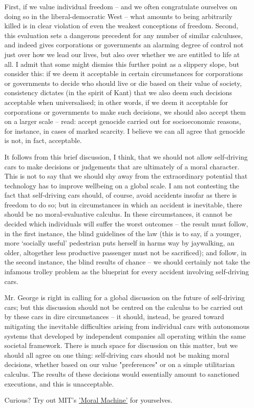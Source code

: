    First, if we value individual freedom -- and we often congratulate
   ourselves on doing so in the liberal-democratic West -- what amounts to
   being arbitrarily killed is in clear violation of even the weakest
   conceptions of freedom. Second, this evaluation sets a dangerous
   precedent for any number of similar calculuses, and indeed gives
   corporations or governments an alarming degree of control not just over
   how we lead our lives, but also over whether we are entitled to life at
   all. I admit that some might dismiss this further point as a slippery
   slope, but consider this: if we deem it acceptable in certain
   circumstances for corporations or governments to decide who should live
   or die based on their value of society, consistency dictates (in the
   spirit of Kant) that we also deem such decisions acceptable when
   universalised; in other words, if we deem it acceptable for
   corporations or governments to make such decisions, we should also
   accept them on a larger scale -- read: accept genocide carried out for
   socioeconomic reasons, for instance, in cases of marked scarcity. I
   believe we can all agree that genocide is not, in fact, acceptable.

   It follows from this brief discussion, I think, that we should not
   allow self-driving cars to make decisions or judgements that are
   ultimately of a moral character. This is not to say that we should shy
   away from the extraordinary potential that technology has to improve
   wellbeing on a global scale. I am not contesting the fact that
   self-driving cars should, of course, avoid accidents insofar as there
   is freedom to do so; but in circumstances in which an accident is
   inevitable, there should be no moral-evaluative calculus. In these
   circumstances, it cannot be decided which individuals will suffer the
   worst outcomes -- the result must follow, in the first instance, the
   blind guidelines of the law (this is to say, if a younger, more
   `socially useful' pedestrian puts herself in harms way by jaywalking,
   an older, altogether less productive passenger must not be sacrificed);
   and follow, in the second instance, the blind results of chance -- we
   should certainly not take the infamous trolley problem as the blueprint
   for every accident involving self-driving cars.

   Mr. George is right in calling for a global discussion on the future of
   self-driving cars; but this discussion should not be centred on the
   calculus to be carried out by these cars in dire circumstances -- it
   should, instead, be geared toward mitigating the inevitable
   difficulties arising from individual cars with autonomous systems that
   developed by independent companies all operating within the same
   societal framework. There is much space for discussion on this matter,
   but we should all agree on one thing: self-driving cars should not be
   making moral decisions, whether based on our value "preferences" or on
   a simple utilitarian calculus. The results of these decisions would
   essentially amount to sanctioned executions, and this is unacceptable.


   Curious? Try out MIT's \href{http://moralmachine.mit.edu}{'Moral Machine'} for yourselves.

